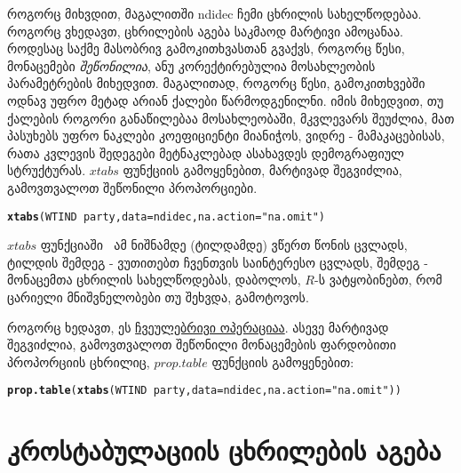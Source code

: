 \documentclass{article}\usepackage[]{graphicx}\usepackage[]{color}
\makeatletter
\newcommand{\hlstr}[1]{\textcolor[rgb]{0.192,0.494,0.8}{#1}}%
\newcommand{\hlopt}[1]{\textcolor[rgb]{0,0,0}{#1}}%
\newcommand{\hlstd}[1]{\textcolor[rgb]{0.345,0.345,0.345}{#1}}%
\newcommand{\hlkwc}[1]{\textcolor[rgb]{0.333,0.667,0.333}{#1}}%
\newcommand{\hlkwd}[1]{\textcolor[rgb]{0.737,0.353,0.396}{\textbf{#1}}}%
\newenvironment{kframe}{%
 \def\at@end@of@kframe{}%
 \ifinner\ifhmode%
  \def\at@end@of@kframe{\end{minipage}}%
  \begin{minipage}{\columnwidth}%
 \fi\fi%
 \def\FrameCommand##1{\hskip\@totalleftmargin \hskip-\fboxsep
 \colorbox{shadecolor}{##1}\hskip-\fboxsep
     \hskip-\linewidth \hskip-\@totalleftmargin \hskip\columnwidth}%
 \MakeFramed {\advance\hsize-\width
   \@totalleftmargin\z@ \linewidth\hsize
   \@setminipage}}%
 {\par\unskip\endMakeFramed%
 \at@end@of@kframe}
\newenvironment{knitrout}{}{} %
\makeatother
\begin{document}
როგორც მიხვდით, მაგალითში ndidec ჩემი ცხრილის სახელწოდებაა. როგორც ვხედავთ, ცხრილების აგება საკმაოდ მარტივი ამოცანაა. როდესაც საქმე მასობრივ გამოკითხვასთან გვაქვს, როგორც წესი, მონაცემები \emph{შეწონილია}, ანუ კორექტირებულია მოსახლეობის პარამეტრების მიხედვით. მაგალითად, როგორც წესი, გამოკითხვებში ოდნავ უფრო მეტად არიან ქალები წარმოდგენილნი. იმის მიხედვით, თუ ქალების როგორი განაწილებაა მოსახლეობაში, მკვლევარს შეუძლია, მათ პასუხებს უფრო ნაკლები კოეფიციენტი მიანიჭოს, ვიდრე - მამაკაცებისას, რათა კვლევის შედეგები მეტნაკლებად ასახავდეს დემოგრაფიულ სტრუქტურას. $xtabs$ ფუნქციის გამოყენებით, მარტივად შეგვიძლია, გამოვთვალოთ შეწონილი პროპორციები. 


\begin{knitrout}
\color{fgcolor}\begin{kframe}
\begin{alltt}
\hlkwd{xtabs}\hlstd{(WTIND}\hlopt{~}\hlstd{party,} \hlkwc{data}\hlstd{=ndidec,} \hlkwc{na.action} \hlstd{=} \hlstr{"na.omit"}\hlstd{)}
\end{alltt}
\end{kframe}
\end{knitrout}

$xtabs$ ფუნქციაში $~$ ამ ნიშნამდე (ტილდამდე) ვწერთ წონის ცვლადს, ტილდის შემდეგ - ვუთითებთ ჩვენთვის საინტერესო ცვლადს, შემდეგ - მონაცემთა ცხრილის სახელწოდებას, დაბოლოს, $R$-ს ვატყობინებთ, რომ ცარიელი მნიშვნელობები თუ შეხვდა, გამოტოვოს.

როგორც ხედავთ, ეს \href{https://www.youtube.com/watch?v=-E1LTc260g0}{ჩვეულებრივი ოპერაციაა}. ასევე მარტივად შეგვიძლია, გამოვთვალოთ შეწონილი მონაცემების ფარდობითი პროპორციის ცხრილიც, $prop.table$ ფუნქციის გამოყენებით:

\begin{knitrout}
\color{fgcolor}\begin{kframe}
\begin{alltt}
\hlkwd{prop.table}\hlstd{(}\hlkwd{xtabs}\hlstd{(WTIND}\hlopt{~}\hlstd{party,} \hlkwc{data}\hlstd{=ndidec,} \hlkwc{na.action} \hlstd{=} \hlstr{"na.omit"}\hlstd{))}
\end{alltt}
\end{kframe}
\end{knitrout}


\section*{კროსტაბულაციის ცხრილების აგება}
\end{document}
